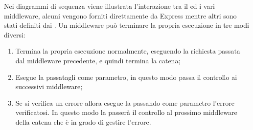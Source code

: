 Nei diagrammi di sequenza viene illustrata l'interazione tra il  ed i vari middleware, alcuni vengono forniti direttamente da Express mentre altri sono stati definiti dai \rPs. Un middleware può terminare la propria esecuzione in tre modi diversi:
\begin{enumerate}
\item Termina la propria esecuzione normalmente, eseguendo la richiesta passata dal middleware precedente, e quindi termina la catena;
\item Esegue la  passatagli come parametro, in questo modo passa il controllo ai successivi middleware;
\item Se si verifica un errore allora esegue la  passando come parametro l'errore verificatosi. In questo modo la  passerà il controllo al prossimo middleware della catena che è in grado di gestire l'errore.
\end{enumerate}
